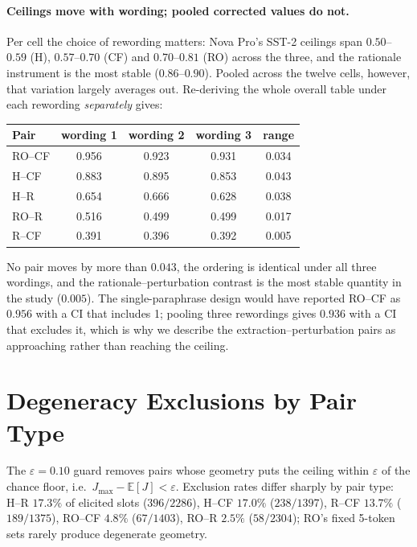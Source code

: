 \documentclass[11pt]{article}
\begin{document}
\paragraph{Ceilings move with wording; pooled corrected values do not.} Per cell the choice of rewording matters: Nova Pro's SST-2 ceilings span $0.50$--$0.59$ (H), $0.57$--$0.70$ (CF) and $0.70$--$0.81$ (RO) across the three, and the rationale instrument is the most stable ($0.86$--$0.90$). Pooled across the twelve cells, however, that variation largely averages out. Re-deriving the whole overall table under each rewording \emph{separately} gives:

\begin{center}
\small
\setlength{\tabcolsep}{4pt}
\begin{tabular}{lcccc}
\toprule
Pair & wording 1 & wording 2 & wording 3 & range \\
\midrule
RO--CF & 0.956 & 0.923 & 0.931 & 0.034 \\
H--CF  & 0.883 & 0.895 & 0.853 & 0.043 \\
H--R   & 0.654 & 0.666 & 0.628 & 0.038 \\
RO--R  & 0.516 & 0.499 & 0.499 & 0.017 \\
R--CF  & 0.391 & 0.396 & 0.392 & 0.005 \\
\bottomrule
\end{tabular}
\end{center}

No pair moves by more than $0.043$, the ordering is identical under all three wordings, and the rationale--perturbation contrast is the most stable quantity in the study ($0.005$). The single-paraphrase design would have reported RO--CF as $0.956$ with a CI that includes 1; pooling three rewordings gives $0.936$ with a CI that excludes it, which is why we describe the extraction--perturbation pairs as approaching rather than reaching the ceiling.

\section{Degeneracy Exclusions by Pair Type}
\label{app:degeneracy}

The $\varepsilon=0.10$ guard removes pairs whose geometry puts the ceiling within $\varepsilon$ of the chance floor, i.e.\ $J_{\max}-\mathbb{E}[J]<\varepsilon$. Exclusion rates differ sharply by pair type: H--R $17.3\%$ of elicited slots ($396/2286$), H--CF $17.0\%$ ($238/1397$), R--CF $13.7\%$ ($189/1375$), RO--CF $4.8\%$ ($67/1403$), RO--R $2.5\%$ ($58/2304$); RO's fixed 5-token sets rarely produce degenerate geometry.
\end{document}
